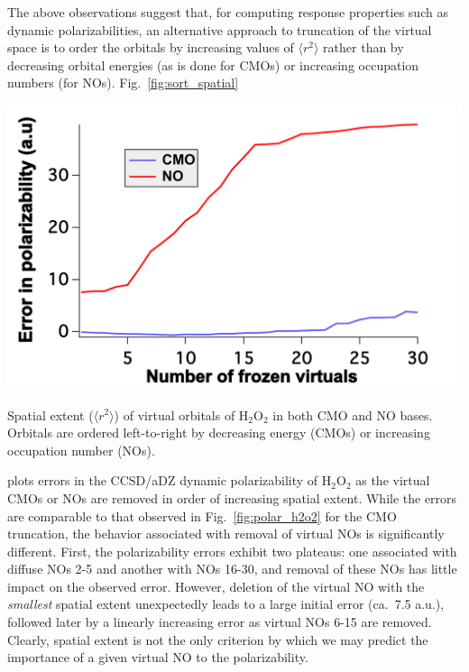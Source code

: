 The above observations suggest that, for computing response properties such as
dynamic polarizabilities, an alternative approach to truncation of the virtual
space is to order the orbitals by increasing values of $\langle r^2 \rangle$
rather than by decreasing orbital energies (as is done for CMOs) or increasing
occupation numbers (for NOs).  Fig.~\ref{fig:sort_spatial} 
\begin{MyFigure}[h!]
\centering
\includegraphics[width=0.6\linewidth,natwidth=610,natheight=642]{figures_fvno/sort_spatial.pdf}
\caption{{\footnotesize Spatial extent ($\langle r^2\rangle$) of virtual
orbitals of H$_2$O$_2$ in both CMO and NO bases.  Orbitals are ordered
left-to-right by decreasing energy (CMOs) or increasing occupation number (NOs).}}
\label{fig:sort_spatial}
\end{MyFigure}
plots errors in the CCSD/aDZ dynamic polarizability of H$_2$O$_2$ as the virtual CMOs or NOs are
removed in order of increasing spatial extent.  While the errors are
comparable to that observed in Fig.~\ref{fig:polar_h2o2} for the CMO
truncation, the behavior associated with removal of virtual NOs is
significantly different.  First, the polarizability errors exhibit two
plateaus: one associated with diffuse NOs 2-5 and another with NOs 16-30, and
removal of these NOs has little impact on the observed error.  However,
deletion of the virtual NO with the {\em smallest} spatial extent unexpectedly
leads to a large initial error (ca.\ 7.5 a.u.), followed later by a linearly
increasing error as virtual NOs 6-15 are removed.  Clearly, spatial extent is
not the only criterion by which we may predict the importance of a given
virtual NO to the polarizability.

